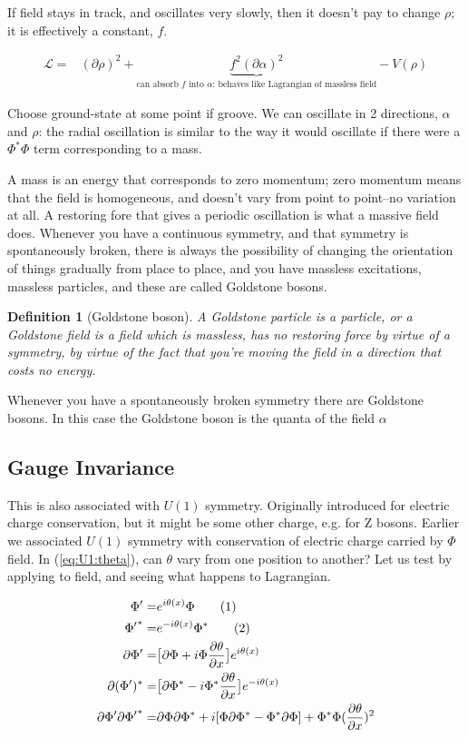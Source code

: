 \documentclass[]{article}
\newcommand\numberthis{\addtocounter{equation}{1}\tag{\theequation}}
\newtheorem{defn}[thm]{Definition}
\begin{document}
If field stays in track, and oscillates very slowly, then it doesn't pay to change $\rho$; it is effectively a constant, $f$.

\begin{align*}
	\mathcal{L} =& (\partial \rho)^2 + \underbrace{f^2(\partial \alpha)^2}_\text{can absorb $f$ into $\alpha$: behaves like Lagrangian of massless field}   - V(\rho)
\end{align*}

Choose ground-state at some point if groove. We can oscillate in 2 directions, $\alpha$ and $\rho$: the radial oscillation is similar to the way it would oscillate if there were a $\Phi^*\Phi$ term corresponding to a mass.

A mass is an energy that corresponds to zero momentum; zero momentum means that the field is homogeneous, and doesn't vary from point to point--no variation at all. A restoring fore that gives a periodic oscillation is what a massive field does. Whenever you have a continuous symmetry, and that symmetry is spontaneously broken, there is always the possibility of changing the orientation of things gradually from place to place, and you have massless excitations, massless particles, and these are called Goldstone bosons.
\begin{defn}[Goldstone boson]
	 A Goldstone particle is a particle, or a Goldstone field is a field which is massless, has no restoring force by virtue of a symmetry, by virtue of the fact that you're moving the field in a direction that costs no energy.
\end{defn}
 Whenever you have a spontaneously broken symmetry there are Goldstone bosons. In this case the Goldstone boson is the quanta of the field $\alpha$

\subsection{Gauge Invariance}\label{section:gauge:invariance}

This is also associated with $U(1)$ symmetry. Originally introduced for electric charge conservation, but it might be some other charge, e.g. for Z bosons. Earlier we associated $U(1)$ symmetry with conservation of electric charge carried by $\Phi$ field. In (\ref{eq:U1:theta}), can $\theta$ vary from one position to another? Let us test by applying to field, and seeing what happens to Lagrangian.

\begin{align*}
	\Phi^\prime =& e^{i \theta(x)} \Phi \numberthis \label{eq:gauge-phi}\\
	{\Phi^\prime}^* =& e^{-i \theta(x)} \Phi^* \numberthis \label{eq:gauge-phi-star}\\
	\partial \Phi^\prime =& \big[\partial \Phi + i \Phi \frac{\partial \theta}{\partial x}\big] e^{i \theta(x)}\\
	\partial (\Phi^\prime)^* =& \big[\partial \Phi^* - i \Phi^* \frac{\partial \theta}{\partial x}\big] e^{-i \theta(x)}\\
	\partial \Phi^\prime \partial {\Phi^\prime}^* =&\partial \Phi \partial \Phi^* + i[\Phi \partial \Phi^* -\Phi^* \partial \Phi] + \Phi^* \Phi (\frac{\partial \theta}{\partial x})^2
\end{align*}
\end{document}
